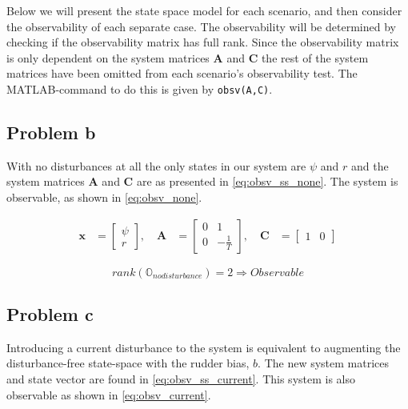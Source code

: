 Below we will present the state space model for each scenario, and then consider the observability of each separate case. The observability will be determined by checking if the observability matrix has full rank\cite{chen}. Since the observability matrix is only dependent on the system matrices $\mathbf{A}$ and $\mathbf{C}$ the rest of the system matrices have been omitted from each scenario's observability test. The MATLAB-command to do this is given by \texttt{obsv(A,C)}.


\subsection{Problem b}
With no disturbances at all the only states in our system are $\psi$ and $r$ and the system matrices $\mathbf{A}$ and $\mathbf{C}$ are as presented in \cref{eq:obsv_ss_none}. The system is observable, as shown in \cref{eq:obsv_none}. 


\begin{equation}\label{eq:obsv_ss_none}
\begin{aligned}
\mathbf{x} &= \begin{bmatrix} \psi \\ r  \end{bmatrix},
\quad \mathbf{A} &= \begin{bmatrix} 0 & 1 \\ 0 & -\frac{1}{T}  \end{bmatrix},
\quad \mathbf{C} &= \begin{bmatrix} 1 & 0 \end{bmatrix}
\end{aligned}
\end{equation}

\begin{equation}\label{eq:obsv_none}
    rank(\mathbb{O}_{no disturbance}) = 2 \Rightarrow Observable
\end{equation}

\subsection{Problem c}
Introducing a current disturbance to the system is equivalent to augmenting the disturbance-free state-space with the rudder bias, $b$. The new system matrices and state vector are found in \cref{eq:obsv_ss_current}. This system is also observable as shown in \cref{eq:obsv_current}.

